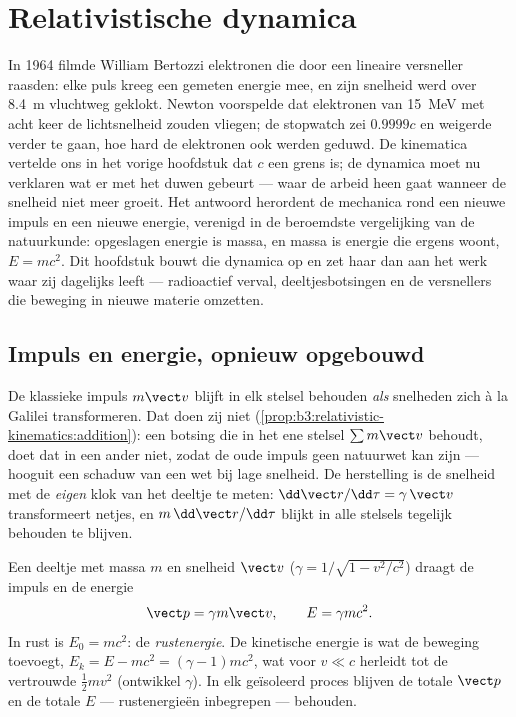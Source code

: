 \chapter{Relativistische dynamica}\label{ch:b3:relativistic-dynamics}

In 1964 filmde William Bertozzi elektronen die door een lineaire
versneller raasden: elke puls kreeg een gemeten energie mee, en zijn
snelheid werd over \qty{8.4}{m} vluchtweg geklokt. Newton voorspelde dat
elektronen van \qty{15}{MeV} met acht keer de lichtsnelheid zouden
vliegen; de stopwatch zei $0.9999c$ en weigerde verder te gaan, hoe hard
de elektronen ook werden geduwd. De kinematica vertelde ons in het vorige
hoofdstuk dat $c$ een grens is; de dynamica moet nu verklaren wat er met
het duwen gebeurt --- waar de arbeid heen gaat wanneer de snelheid niet
meer groeit. Het antwoord herordent de mechanica rond een nieuwe impuls
en een nieuwe energie, verenigd in de beroemdste vergelijking van de
natuurkunde: opgeslagen energie is massa, en massa is energie die ergens
woont, $E = mc^2$. Dit hoofdstuk bouwt die dynamica op en zet haar dan
aan het werk waar zij dagelijks leeft --- radioactief verval,
deeltjesbotsingen en de versnellers die beweging in nieuwe materie
omzetten.

\section{Impuls en energie, opnieuw opgebouwd}

\begin{remark}\label{rem:b3:relativistic-dynamics:why}
De klassieke impuls $m\vect v$ blijft in elk stelsel behouden \emph{als}
snelheden zich à la Galilei transformeren. Dat doen zij niet
(\cref{prop:b3:relativistic-kinematics:addition}): een botsing die in het
ene stelsel $\sum m\vect v$ behoudt, doet dat in een ander niet, zodat de
oude impuls geen natuurwet kan zijn --- hooguit een schaduw van een wet
bij lage snelheid. De herstelling is de snelheid met de \emph{eigen} klok
van het deeltje te meten: $\dd\vect r/\dd\tau =
\gamma\,\vect v$
transformeert netjes, en $m\,\dd\vect r/\dd\tau$ blijkt in alle stelsels
tegelijk behouden te blijven.
\end{remark}

\begin{definition}\label{def:b3:relativistic-dynamics:momentum-energy}
Een deeltje met massa $m$ en snelheid $\vect v$ ($\gamma = 1/\sqrt{1 -
v^2/c^2}$) draagt de impuls en de energie
\[
\vect p = \gamma m\vect v , \qquad
E = \gamma mc^2 .
\]
In rust is $E_0 = mc^2$: de \emph{rustenergie}. De kinetische energie is
wat de beweging toevoegt, $E_k = E - mc^2 = (\gamma - 1)mc^2$, wat voor
$v
\ll c$ herleidt tot de vertrouwde $\tfrac12 mv^2$ (ontwikkel
$\gamma$). In elk geïsoleerd proces blijven de totale $\vect p$ en de
totale $E$ --- rustenergieën inbegrepen --- behouden.
\end{definition}


